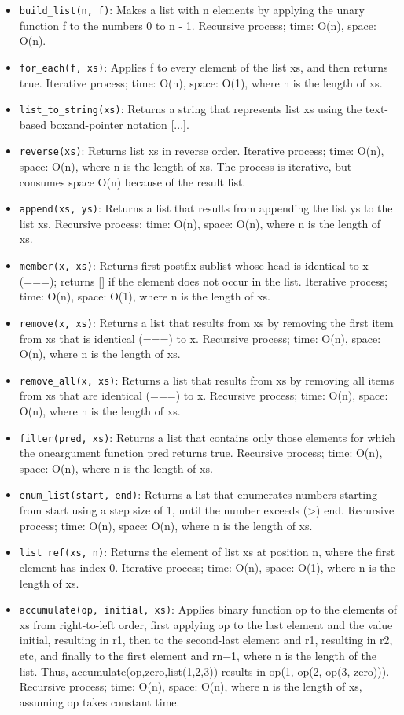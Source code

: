 \documentclass[a4paper]{article} \usepackage[backend=biber, style=numeric, sorting=none]{biblatex}
\begin{document}
\begin{multicols*}{4}
\begin{itemize}
\item \texttt{build\_list(n, f)}: Makes a list with n elements by applying the unary function f to the numbers 0 to n - 1. Recursive process; time: O(n), space: O(n).
\item \texttt{for\_each(f, xs)}: Applies f to every element of the list xs, and then returns true. Iterative process; time: O(n), space: O(1), where n is the length of xs.
\item \texttt{list\_to\_string(xs)}: Returns a string that represents list xs using the text-based boxand-pointer notation [...].
\item \texttt{reverse(xs)}: Returns list xs in reverse order. Iterative process; time: O(n), space: O(n), where n is the length of xs. The process is iterative, but consumes space O(n) because of the result list.
\item \texttt{append(xs, ys)}: Returns a list that results from appending the list ys to the list xs. Recursive process; time: O(n), space: O(n), where n is the length of xs.
\item \texttt{member(x, xs)}: Returns first postfix sublist whose head is identical to x (===); returns [] if the element does not occur in the list. Iterative process; time: O(n), space: O(1), where n is the length of xs.
\item \texttt{remove(x, xs)}: Returns a list that results from xs by removing the first item from xs that is identical (===) to x. Recursive process; time: O(n), space: O(n), where n is the length of xs.
\item \texttt{remove\_all(x, xs)}: Returns a list that results from xs by removing all items from xs that are identical (===) to x. Recursive process; time: O(n), space: O(n), where n is the length of xs.
\item \texttt{filter(pred, xs)}: Returns a list that contains only those elements for which the oneargument function pred returns true. Recursive process; time: O(n), space: O(n), where n is the length of xs.
\item \texttt{enum\_list(start, end)}: Returns a list that enumerates numbers starting from start using a step size of 1, until the number exceeds (>) end. Recursive process; time: O(n), space: O(n), where n is the length of xs.
\item \texttt{list\_ref(xs, n)}: Returns the element of list xs at position n, where the first element has index 0. Iterative process; time: O(n), space: O(1), where n is the length of xs.
\item \texttt{accumulate(op, initial, xs)}: Applies binary function op to the elements of xs from right-to-left order, first applying op to the last element and the value initial, resulting in r1, then to the second-last element and r1, resulting in r2, etc, and finally to the first element and rn−1, where n is the length of the list. Thus, accumulate(op,zero,list(1,2,3)) results in op(1, op(2, op(3, zero))). Recursive process; time: O(n), space: O(n), where n is the length of xs, assuming op takes constant time.
\end{itemize}


\end{multicols*}
\end{document}
